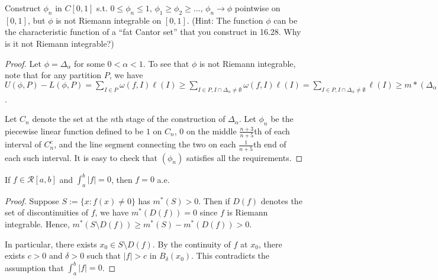  Construct $\phi_n$ in $C[0,1]$ s.t. $0\leq \phi_n \leq 1$, $\phi_1 \geq \phi_2 \geq \ldots$, $\phi_n \rightarrow \phi$ pointwise on $[0,1]$, but $\phi$ is not Riemann integrable on $[0,1]$. (Hint: The function $\phi$ can be the characteristic function of a ``fat Cantor set'' that you construct in 16.28. Why is it not Riemann integrable?)
\begin{proof}
Let $\phi = \Delta_\alpha$ for some $0 < \alpha < 1$. To see that $\phi$ is not Riemann integrable, note that for any partition $P$, we have $U(\phi, P) - L(\phi,P) = \sum_{I\in P} \omega(f, I) \ell(I) \geq \sum_{I \in P, I \cap \Delta_\alpha \ne \emptyset} \omega(f,I) \ell(I) = \sum_{I \in P, I \cap \Delta_\alpha \ne \emptyset} \ell(I) \geq m*(\Delta_\alpha) = \alpha$.

Let $C_n$ denote the set at the $n$th stage of the construction of $\Delta_\alpha$. Let $\phi_n$ be the piecewise linear function defined to be $1$ on $C_n$, $0$ on the middle $\frac {n+3} {n+5}$th of each interval of $C_n^c$, and the line segment connecting the two on each $\frac 1 {n+5}$th end of each such interval. It is easy to check that $(\phi_n)$ satisfies all the requirements.
\end{proof}

 If $f \in \mathcal{R}[a,b]$ and $\int_a^b |f| = 0$, then $f = 0$ a.e.
\begin{proof}
Suppose $S:= \{x : f(x) \neq 0\}$ has $m^*(S) > 0$.  Then if $D(f)$ denotes the set of discontinuities of $f$, we have $m^*(D(f)) = 0$ since $f$ is Riemann integrable. Hence, $m^*(S \setminus D(f)) \geq m^*(S) - m^*(D(f)) > 0$. 

In particular, there exists $x_0 \in S\setminus D(f)$. By the continuity of $f$ at $x_0$, there exists $c > 0$ and $\delta > 0$ such that $|f| > c$ in $B_{\delta}(x_0)$. This contradicts the assumption that $\int_a^b |f| = 0$.
\end{proof}



